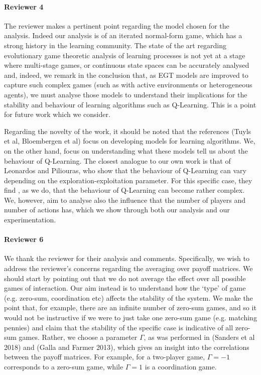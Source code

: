\documentclass{article}
\begin{document}
\paragraph{Reviewer 4} %
\label{par:reviewer_4}

The reviewer makes a pertinent point regarding the model chosen for the analysis. Indeed our
analysis is of an iterated normal-form game, which has a strong history in the learning community.
The state of the art regarding evolutionary game theoretic analysis of learning processes is not yet
at a stage where multi-stage games, or continuous state spaces can be accurately analysed and,
indeed, we remark in the conclusion that, as EGT models are improved to capture such complex games 
(such as with active environments or heterogeneous agents), we must analyse those models to
understand their implications for the stability and behaviour of learning algorithms such as
Q-Learning. This is a point for future work which we consider.

Regarding the novelty of the work, it should be noted that the references (Tuyls et al,
Bloembergen et al) focus on developing models for learning algorithms. We, on the other hand, focus
on understanding what these models tell us about the behaviour of Q-Learning. The closest analogue
to our own work is that of Leonardos and Piliouras, who show that the behaviour of Q-Learning can
vary
depending on the exploration-exploitation parameter. For this specific case, they find , as we do,
that the behaviour of Q-Learning can become rather complex. We, however, aim to analyse also the
influence that the number of players and number of actions has, which we show through both our
analysis and our experimentation.


\paragraph{Reviewer 6} %
\label{par:reviewer_6}

We thank the reviewer for their analysis and comments. Specifically, we wish to address the
reviewer's concerns regarding the averaging over payoff matrices. We should start by pointing out
that we do not average the effect over all possible games of interaction. Our aim instead is to
understand how the `type' of game (e.g. zero-sum, coordination etc) affects the stability of the
system. We make the point that, for example, there are an infinite number of zero-sum games, and so
it would not be instructive if we were to just take one zero-sum game (e.g. matching pennies) and
claim that the stability of the specific case is indicative of all zero-sum games. Rather, we choose
a parameter $\Gamma$, as was performed in (Sanders et al 2018) and (Galla and Farmer 2013), which
gives an insight into the correlations between the payoff matrices. For example, for a two-player
game, $\Gamma = -1$ corresponds to a zero-sum game, while $\Gamma = 1$ is a coordination game.
\end{document}

